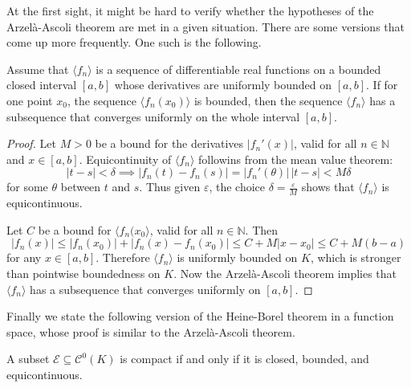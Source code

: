 \documentclass[11pt]{article}
\begin{document}
At the first sight, it might be hard to verify whether the hypotheses of the Arzel\`a-Ascoli theorem are met in a given situation.
There are some versions that come up more frequently.
One such is the following.

\begin{cor}
  Assume that $\langle f_n \rangle$ is a sequence of differentiable real functions on a bounded closed interval $[a,b]$ whose derivatives are uniformly bounded on $[a,b]$.
  If for one point $x_0$, the sequence $\langle f_n(x_0) \rangle$ is bounded, then the sequence $\langle f_n \rangle$ has a subsequence that converges uniformly on the whole interval $[a,b]$.
\end{cor}

\begin{proof}
  Let $M > 0$ be a bound for the derivatives $|f_n'(x)|$, valid for all $n \in \mathbb{N}$ and $x \in [a,b]$.
  Equicontinuity of $\langle f_n \rangle$ followins from the mean value theorem:
  \[
    |t-s| < \delta \implies |f_n(t) - f_n(s)| = |f_n'(\theta)| \, |t-s| < M \delta
  \]
  for some $\theta$ between $t$ and $s$.
  Thus given $\varepsilon$, the choice $\delta = \frac{\varepsilon}{M}$ shows that $\langle f_n \rangle$ is equicontinuous.

  Let $C$ be a bound for $\langle f_n(x_0 \rangle$, valid for all $n \in \mathbb{N}$.  Then
  \[
    |f_n(x)| \leqslant |f_n(x_0)| + |f_n(x) - f_n(x_0)| \leqslant C + M |x-x_0| \leqslant C + M (b-a)
  \]
    for any $x \in [a,b]$.  Therefore $\langle f_n \rangle$ is uniformly bounded on $K$, which is stronger than pointwise boundedness on $K$.
    Now the Arzel\`a-Ascoli theorem implies that $\langle f_n \rangle$ has a subsequence that converges uniformly on $[a,b]$.
\end{proof}

Finally we state the following version of the Heine-Borel theorem in a function space, whose proof is similar to the Arzel\`a-Ascoli theorem.

\begin{thm}
   \label{thm:HBC}
   A subset $\mathcal{E} \subseteq \mathcal{C}^0(K)$ is compact if and only if it is closed, bounded, and equicontinuous.
\end{thm}
\end{document}
